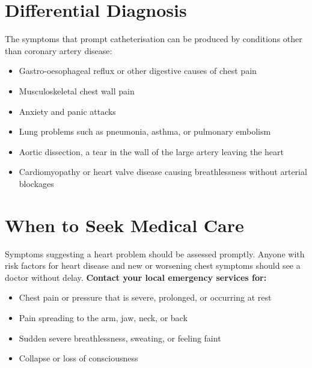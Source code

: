 \section*{Differential Diagnosis}
The symptoms that prompt catheterisation can be produced by conditions other than coronary artery disease:
\begin{itemize}
    \item Gastro-oesophageal reflux or other digestive causes of chest pain
    \item Musculoskeletal chest wall pain
    \item Anxiety and panic attacks
    \item Lung problems such as pneumonia, asthma, or pulmonary embolism
    \item Aortic dissection, a tear in the wall of the large artery leaving the heart
    \item Cardiomyopathy or heart valve disease causing breathlessness without arterial blockages
\end{itemize}

\section*{When to Seek Medical Care}
Symptoms suggesting a heart problem should be assessed promptly. Anyone with risk factors for heart disease and new or worsening chest symptoms should see a doctor without delay.
\textbf{Contact your local emergency services for:}
\begin{itemize}
    \item Chest pain or pressure that is severe, prolonged, or occurring at rest
    \item Pain spreading to the arm, jaw, neck, or back
    \item Sudden severe breathlessness, sweating, or feeling faint
    \item Collapse or loss of consciousness
\end{itemize}

